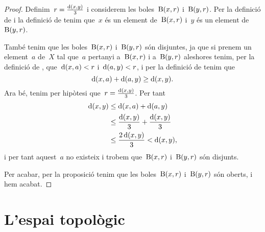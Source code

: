 \documentclass[../../main.tex]{subfiles}
\begin{document}
    \begin{proof}
        Definim~\(r=\frac{\operatorname{d}(x,y)}{3}\) i considerem les boles~\(\operatorname{B}(x,r)\) i~\(\operatorname{B}(y,r)\).
        Per la definició de  i la definició de  tenim que~\(x\) és un element de~\(\operatorname{B}(x,r)\) i~\(y\) és un element de~\(\operatorname{B}(y,r)\).

        També tenim que les boles~\(\operatorname{B}(x,r)\) i~\(\operatorname{B}(y,r)\) són disjuntes, ja que si prenem un element~\(a\) de~\(X\) tal que~\(a\) pertanyi a~\(\operatorname{B}(x,r)\) i a~\(\operatorname{B}(y,r)\) aleshores tenim, per la definició de , que~\(\operatorname{d}(x,a)<r\) i~\(\operatorname{d}(a,y)<r\), i per la definició de  tenim que
        \[
            \operatorname{d}(x,a)+\operatorname{d}(a,y)\geq \operatorname{d}(x,y).
        \]
        Ara bé, tenim per hipòtesi que~\(r=\frac{\operatorname{d}(x,y)}{3}\).
        Per tant
        \begin{align*}
            \operatorname{d}(x,y) &\leq \operatorname{d}(x,a)+\operatorname{d}(a,y) \\
            &\leq \frac{\operatorname{d}(x,y)}{3} + \frac{\operatorname{d}(x,y)}{3} \\
            &\leq \frac{2\operatorname{d}(x,y)}{3} < \operatorname{d}(x,y),
        \end{align*}
        i per tant aquest~\(a\) no existeix i trobem que~\(\operatorname{B}(x,r)\) i~\(\operatorname{B}(y,r)\) són disjunts.

        Per acabar, per la proposició  tenim que les boles~\(\operatorname{B}(x,r)\) i~\(\operatorname{B}(y,r)\) són oberts, i hem acabat.
    \end{proof}
\section{L'espai topològic}
\end{document}

